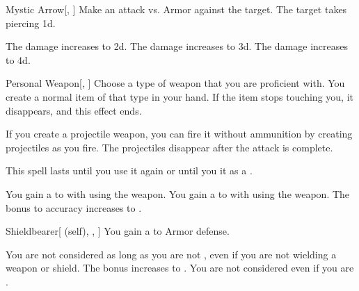 \lowercase{\hypertarget{spell:Mystic Arrow}{}}\label{spell:Mystic Arrow}
\begin{freeability}[Rank 1]{\hypertarget{spell:Mystic Arrow}{Mystic Arrow}}[, ]
Make an attack vs. Armor against the target.
\hit The target takes piercing  \plus1d.

\rankline
{} The damage increases to  \plus2d.
 The damage increases to  \plus3d.
 The damage increases to  \plus4d.
\end{freeability}
\vspace{0.25em}



\lowercase{\hypertarget{spell:Personal Weapon}{}}\label{spell:Personal Weapon}
\begin{freeability}[Rank 1]{\hypertarget{spell:Personal Weapon}{Personal Weapon}}[, ]
Choose a type of weapon that you are proficient with.
You create a normal item of that type in your hand.
If the item stops touching you, it disappears, and this effect ends.

If you create a projectile weapon, you can fire it without ammunition by creating projectiles as you fire.
The projectiles disappear after the attack is complete.

This spell lasts until you use it again or until you  it as a .

\rankline
{} You gain a   to  with  using the weapon.
 You gain a   to  with  using the weapon.
 The bonus to accuracy increases to .
\end{freeability}
\vspace{0.25em}



\lowercase{\hypertarget{spell:Shieldbearer}{}}\label{spell:Shieldbearer}
\begin{attuneability}[Rank 1]{\hypertarget{spell:Shieldbearer}{Shieldbearer}}[ (self), , ]
You gain a   to Armor defense.

\rankline
{} You are not considered  as long as you are not , even if you are not wielding a weapon or shield.
 The bonus increases to .
 You are not considered  even if you are .
\end{attuneability}
\vspace{0.25em}



